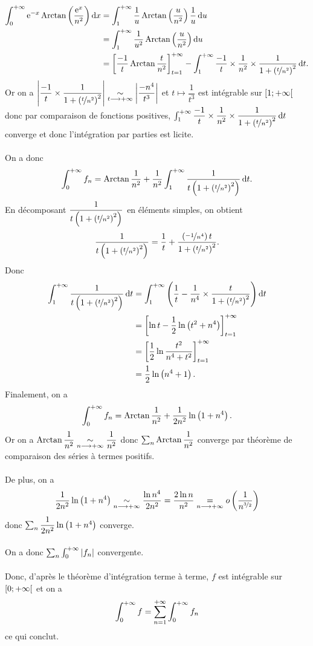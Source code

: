\begin{corr}
\begin{itemize}
\[\begin{aligned}
        \int_0^{\pinf}\e{-x}\Arctan\paren{\dfrac{\e{x}}{n^2}}\odif{x}&=\int_1^{\pinf}\dfrac{1}{u}\Arctan\paren{\dfrac{u}{n^2}}\dfrac{1}{u}\odif{u} \\
        &=\int_1^{\pinf}\dfrac{1}{u^2}\Arctan\paren{\dfrac{u}{n^2}}\odif{u} \\
        &=\croch{\dfrac{-1}{t}\Arctan\dfrac{t}{n^2}}_{t=1}^{\pinf}-\int_1^{\pinf}\dfrac{-1}{t}\times\dfrac{1}{n^2}\times\dfrac{1}{1+\paren{\nicefrac{t}{n^2}}^2}\odif{t}.
    \end{aligned}\] Or on a \(\left\lvert\dfrac{-1}{t}\times\dfrac{1}{1+\left(\nicefrac{t}{n^2}\right)^2}\right\rvert\underset{t\longrightarrow+\infty}{\sim}\left\lvert\dfrac{-n^4}{t^3}\right\rvert\) et \(t\mapsto\dfrac{1}{t^3}\) est intégrable sur \(\left[1;+\infty\right[\) donc par comparaison de fonctions positives, \(\int_1^{\pinf}\dfrac{-1}{t}\times\dfrac{1}{n^2}\times\dfrac{1}{1+\paren{\nicefrac{t}{n^2}}^2}\odif{t}\) converge et donc l'intégration par parties est licite. \\\\ On a donc \[\int_0^{\pinf}f_n=\Arctan\dfrac{1}{n^2}+\dfrac{1}{n^2}\int_1^{\pinf}\dfrac{1}{t\paren{1+\paren{\nicefrac{t}{n^2}}^2}}\odif{t}.\] En décomposant \(\dfrac{1}{t\left(1+\left(\nicefrac{t}{n^2}\right)^2\right)}\) en éléments simples, on obtient \[\dfrac{1}{t\left(1+\left(\nicefrac{t}{n^2}\right)^2\right)}=\dfrac{1}{t}+\dfrac{\left(\nicefrac{-1}{n^4}\right)t}{1+\left(\nicefrac{t}{n^2}\right)^2}.\] Donc \[\begin{aligned}
        \int_1^{\pinf}\dfrac{1}{t\paren{1+\paren{\nicefrac{t}{n^2}}^2}}\odif{t}&=\int_1^{\pinf}\paren{\dfrac{1}{t}-\dfrac{1}{n^4}\times\dfrac{t}{1+\paren{\nicefrac{t}{n^2}}^2}}\odif{t} \\
        &=\croch{\ln t-\dfrac{1}{2}\ln\paren{t^2+n^4}}_{t=1}^{\pinf} \\
        &=\croch{\dfrac{1}{2}\ln\dfrac{t^2}{n^4+t^2}}_{t=1}^{\pinf} \\
        &=\dfrac{1}{2}\ln\paren{n^4+1}.
    \end{aligned}\] Finalement, on a \[\int_0^{+\infty}f_n=\operatorname{Arctan}\dfrac{1}{n^2}+\dfrac{1}{2n^2}\ln\left(1+n^4\right).\] Or on a \(\operatorname{Arctan}\dfrac{1}{n^2}\underset{n\longrightarrow+\infty}{\sim}\dfrac{1}{n^2}\) donc \(\sum_n\operatorname{Arctan}\dfrac{1}{n^2}\) converge par théorème de comparaison des séries à termes positifs. \\\\ De plus, on a \[\dfrac{1}{2n^2}\ln\left(1+n^4\right)\underset{n\longrightarrow+\infty}{\sim}\dfrac{\ln n^4}{2n^2}=\dfrac{2\ln n}{n^2}\underset{n\longrightarrow+\infty}{=}o\left(\dfrac{1}{n^{\nicefrac{3}{2}}}\right)\] donc \(\sum_n\dfrac{1}{2n^2}\ln\left(1+n^4\right)\) converge. \\\\ On a donc \(\sum_n\int_0^{+\infty}\left\lvert f_n\right\rvert\) convergente. \\\\ Donc, d'après le théorème d'intégration terme à terme, \(f\) est intégrable sur \(\left[0;+\infty\right[\) et on a \[\int_0^{+\infty}f=\sum_{n=1}^{+\infty}\int_0^{+\infty}f_n\] ce qui conclut.
\end{itemize}
\end{corr}

